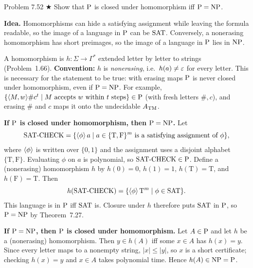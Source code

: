 \begin{question}{Problem 7.52 $\bigstar$}
Show that $\mathrm{P}$ is closed under homomorphism iff $\mathrm{P}=\mathrm{NP}$.
\end{question}
\begin{soln}
\textbf{Idea.} Homomorphisms can hide a satisfying assignment while leaving the formula readable, so the image of a language in $\mathrm{P}$ can be $\mathrm{SAT}$. Conversely, a nonerasing homomorphism has short preimages, so the image of a language in $\mathrm{P}$ lies in $\mathrm{NP}$.

A homomorphism is $h:\Sigma\to\Gamma^*$ extended letter by letter to strings (Problem~1.66). \textbf{Convention:} $h$ is \emph{nonerasing}, i.e.\ $h(a)\neq\varepsilon$ for every letter. This is necessary for the statement to be true: with erasing maps $\mathrm{P}$ is never closed under homomorphism, even if $\mathrm{P}=\mathrm{NP}$. For example, $\{\langle M,w\rangle\#c^t\mid M\text{ accepts }w\text{ within }t\text{ steps}\}\in\mathrm{P}$ (with fresh letters $\#,c$), and erasing $\#$ and $c$ maps it onto the undecidable $A_{\mathrm{TM}}$.

\textbf{If $\mathrm{P}$ is closed under homomorphism, then $\mathrm{P}=\mathrm{NP}$.}
Let
\[
\mathrm{SAT\text{-}CHECK}=\{\langle \phi\rangle\,a\mid a\in\{\mathrm{T},\mathrm{F}\}^m\text{ is a satisfying assignment of $\phi$}\},
\]
where $\langle \phi\rangle$ is written over $\{0,1\}$ and the assignment uses a disjoint alphabet $\{\mathrm{T},\mathrm{F}\}$. Evaluating $\phi$ on $a$ is polynomial, so $\mathrm{SAT\text{-}CHECK}\in\mathrm{P}$. Define a (nonerasing) homomorphism $h$ by $h(0)=0$, $h(1)=1$, $h(\mathrm{T})=\mathrm{T}$, and $h(\mathrm{F})=\mathrm{T}$. Then
\[
h(\mathrm{SAT\text{-}CHECK})=\{\langle \phi\rangle\,\mathrm{T}^m\mid\phi\in\mathrm{SAT}\}.
\]
This language is in $\mathrm{P}$ iff $\mathrm{SAT}$ is. Closure under $h$ therefore puts $\mathrm{SAT}$ in $\mathrm{P}$, so $\mathrm{P}=\mathrm{NP}$ by Theorem~7.27.

\textbf{If $\mathrm{P}=\mathrm{NP}$, then $\mathrm{P}$ is closed under homomorphism.}
Let $A\in\mathrm{P}$ and let $h$ be a (nonerasing) homomorphism. Then $y\in h(A)$ iff some $x\in A$ has $h(x)=y$. Since every letter maps to a nonempty string, $|x|\le|y|$, so $x$ is a short certificate; checking $h(x)=y$ and $x\in A$ takes polynomial time. Hence $h(A)\in\mathrm{NP}=\mathrm{P}$.
\end{soln}

